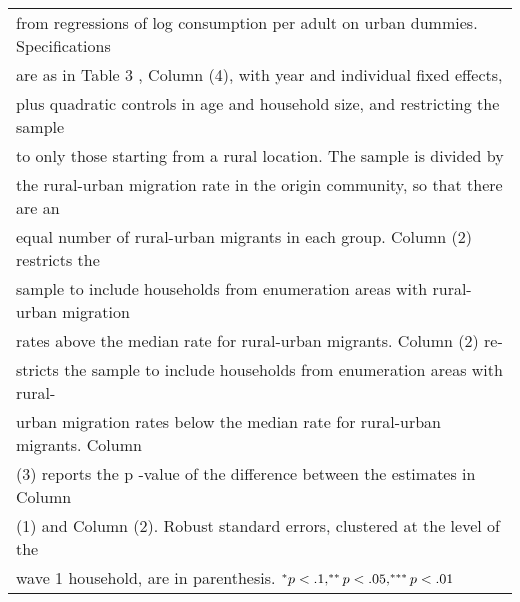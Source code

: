 \begin{table}[htbp]
\begin{tabular}{l*{3}{c}}
\multicolumn{4}{l}{\footnotesize from regressions of log consumption per adult on urban dummies. Specifications}\\
\multicolumn{4}{l}{\footnotesize are as in Table 3 , Column (4), with year and individual fixed effects,}\\
\multicolumn{4}{l}{\footnotesize plus quadratic controls in age and household size, and restricting the sample}\\
\multicolumn{4}{l}{\footnotesize to only those starting from a rural location. The sample is divided by}\\
\multicolumn{4}{l}{\footnotesize the rural-urban migration rate in the origin community, so that there are an}\\
\multicolumn{4}{l}{\footnotesize equal number of rural-urban migrants in each group. Column (2) restricts the}\\
\multicolumn{4}{l}{\footnotesize sample to include households from enumeration areas with rural-urban migration}\\
\multicolumn{4}{l}{\footnotesize rates above the median rate for rural-urban migrants. Column (2) re-}\\
\multicolumn{4}{l}{\footnotesize stricts the sample to include households from enumeration areas with rural-}\\
\multicolumn{4}{l}{\footnotesize urban migration rates below the median rate for rural-urban migrants. Column}\\
\multicolumn{4}{l}{\footnotesize (3) reports the p -value of the difference between the estimates in Column}\\
\multicolumn{4}{l}{\footnotesize (1) and Column (2). Robust standard errors, clustered at the level of the}\\
\multicolumn{4}{l}{\footnotesize wave 1 household, are in parenthesis. $\sym{*} p<.1, \sym{**}p<.05, \sym{***}p<.01$}\\
\end{tabular}
\end{table}
